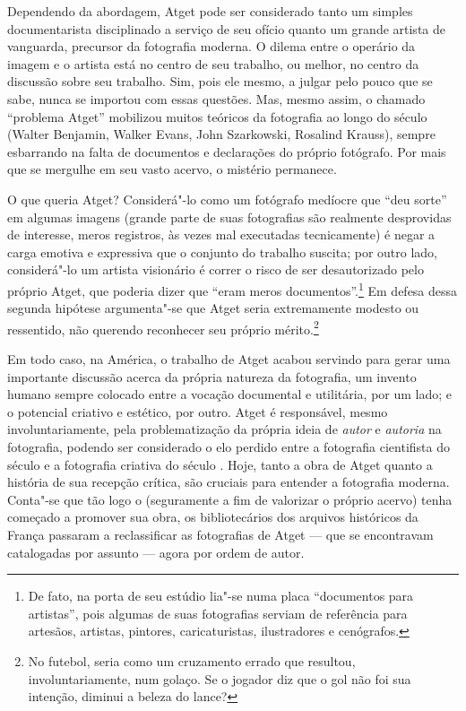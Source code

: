 Dependendo da abordagem, Atget pode ser considerado tanto um simples
documentarista disciplinado a serviço de seu ofício quanto um grande
artista de vanguarda, precursor da fotografia moderna. O dilema entre o
operário da imagem e o artista está no centro de seu trabalho, ou
melhor, no centro da discussão sobre seu trabalho. Sim, pois ele mesmo,
a julgar pelo pouco que se sabe, nunca se importou com essas questões.
Mas, mesmo assim, o chamado ``problema Atget'' mobilizou muitos
teóricos da fotografia ao longo do século  (Walter Benjamin, Walker
Evans, John Szarkowski, Rosalind Krauss), sempre esbarrando na falta de
documentos e declarações do próprio fotógrafo. Por mais que se mergulhe
em seu vasto acervo, o mistério permanece.

O que queria Atget? Considerá"-lo como um fotógrafo medíocre que ``deu
sorte'' em algumas imagens (grande parte de suas fotografias são
realmente desprovidas de interesse, meros registros, às vezes mal
executadas tecnicamente) é negar a carga emotiva e expressiva que o
conjunto do trabalho suscita; por outro lado, considerá"-lo um artista
visionário é correr o risco de ser desautorizado pelo próprio Atget, que
poderia dizer que ``eram meros documentos''.\footnote{De fato, na porta
  de seu estúdio lia"-se numa placa ``documentos para artistas'', pois
  algumas de suas fotografias serviam de referência para artesãos,
  artistas, pintores, caricaturistas, ilustradores e cenógrafos.} Em
defesa dessa segunda hipótese argumenta"-se que Atget seria extremamente
modesto ou ressentido, não querendo reconhecer seu próprio
mérito.\footnote{No futebol, seria como um cruzamento errado que
  resultou, involuntariamente, num golaço. Se o jogador diz que o gol
  não foi sua intenção, diminui a beleza do lance?}

Em todo caso, na América, o trabalho de Atget acabou servindo para gerar
uma importante discussão acerca da própria natureza da fotografia, um
invento humano sempre colocado entre a vocação documental e utilitária,
por um lado; e o potencial criativo e estético, por outro. Atget é
responsável, mesmo involuntariamente, pela problematização da própria
ideia de \emph{autor} e \emph{autoria} na fotografia, podendo ser
considerado o elo perdido entre a fotografia cientifista do século  e
a fotografia criativa do século . Hoje, tanto a obra de Atget quanto a
história de sua recepção crítica, são cruciais para entender a
fotografia moderna. Conta"-se que tão logo o  (seguramente a fim de
valorizar o próprio acervo) tenha começado a promover sua obra, os
bibliotecários dos arquivos históricos da França passaram a
reclassificar as fotografias de Atget --- que se encontravam catalogadas
por assunto --- agora por ordem de autor.

